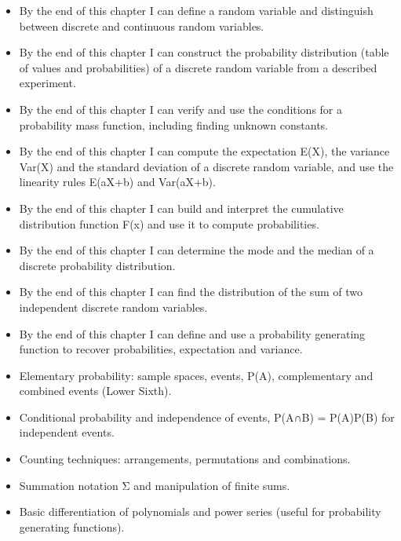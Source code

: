 \documentclass[11pt]{article}
\begin{document}
\begin{objectifs}
\begin{itemize}
\item By the end of this chapter I can define a random variable and distinguish between discrete and continuous random variables.
\item By the end of this chapter I can construct the probability distribution (table of values and probabilities) of a discrete random variable from a described experiment.
\item By the end of this chapter I can verify and use the conditions for a probability mass function, including finding unknown constants.
\item By the end of this chapter I can compute the expectation E(X), the variance Var(X) and the standard deviation of a discrete random variable, and use the linearity rules E(aX+b) and Var(aX+b).
\item By the end of this chapter I can build and interpret the cumulative distribution function F(x) and use it to compute probabilities.
\item By the end of this chapter I can determine the mode and the median of a discrete probability distribution.
\item By the end of this chapter I can find the distribution of the sum of two independent discrete random variables.
\item By the end of this chapter I can define and use a probability generating function to recover probabilities, expectation and variance.
\end{itemize}
\end{objectifs}

\begin{prerequis}
\begin{itemize}
\item Elementary probability: sample spaces, events, P(A), complementary and combined events (Lower Sixth).
\item Conditional probability and independence of events, P(A∩B) = P(A)P(B) for independent events.
\item Counting techniques: arrangements, permutations and combinations.
\item Summation notation Σ and manipulation of finite sums.
\item Basic differentiation of polynomials and power series (useful for probability generating functions).
\end{itemize}
\end{prerequis}
\end{document}
